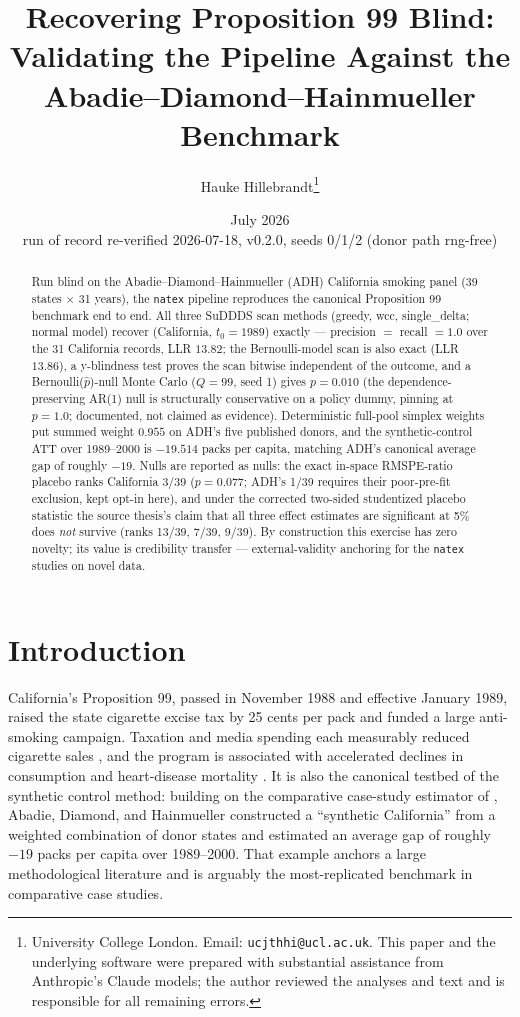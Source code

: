 \documentclass[11pt]{article}
\title{Recovering Proposition 99 Blind: Validating the \natex{} Pipeline
Against the Abadie--Diamond--Hainmueller Benchmark}
\author{Hauke Hillebrandt\thanks{University College London. Email:
\texttt{ucjthhi@ucl.ac.uk}. This paper and the underlying \natex{} software were
prepared with substantial assistance from Anthropic's Claude models; the author
reviewed the analyses and text and is responsible for all remaining errors.}}
\date{July 2026 \\ \small run of record re-verified 2026-07-18, \natex{}
v0.2.0, seeds 0/1/2 (donor path rng-free)}
\newcommand{\natex}{\texttt{natex}}
\begin{document}
\maketitle

\begin{abstract}
\noindent Run blind on the Abadie--Diamond--Hainmueller (ADH) California
smoking panel (39 states $\times$ 31 years), the \natex{} pipeline reproduces
the canonical Proposition 99 benchmark end to end. All three SuDDDS scan
methods (greedy, wcc, single\_delta; normal model) recover
(California, $t_0 = 1989$) exactly --- precision $=$ recall $= 1.0$ over the 31
California records, LLR $13.82$; the Bernoulli-model scan is also exact (LLR
$13.86$), a y-blindness test proves the scan bitwise independent of the
outcome, and a Bernoulli($\hat p$)-null Monte Carlo ($Q=99$, seed 1) gives
$p = 0.010$ (the dependence-preserving AR(1) null is structurally
conservative on a policy dummy, pinning at $p = 1.0$; documented, not
claimed as evidence). Deterministic full-pool simplex weights put summed
weight $0.955$ on ADH's five published donors, and the synthetic-control ATT
over 1989--2000 is $-19.514$ packs per capita, matching ADH's canonical
average gap of roughly $-19$. Nulls are reported as nulls: the
exact in-space RMSPE-ratio placebo ranks California 3/39 ($p = 0.077$;
ADH's 1/39 requires their poor-pre-fit exclusion, kept opt-in here),
and under the corrected two-sided studentized placebo statistic the source
thesis's claim that all three effect estimates are significant at 5\% does
\emph{not} survive (ranks 13/39, 7/39, 9/39). By construction this exercise
has zero novelty; its value is credibility transfer --- external-validity
anchoring for the \natex{} studies on novel data.
\end{abstract}

\section{Introduction}\label{sec:intro}

California's Proposition 99, passed in November 1988 and effective January
1989, raised the state cigarette excise tax by 25 cents per pack and funded a
large anti-smoking campaign. Taxation and media spending each measurably
reduced cigarette sales \cite{hu1995}, and the program is associated with
accelerated declines in consumption and heart-disease mortality
\cite{fichtenberg2000}. It is
also the canonical testbed of the synthetic control method: building on the
comparative case-study estimator of \cite{abadiegardeazabal2003}, Abadie,
Diamond, and Hainmueller \cite{abadie2010} constructed a ``synthetic
California'' from a weighted combination of donor states and estimated an
average gap of roughly $-19$ packs per capita over 1989--2000. That
example anchors a large methodological literature
\cite{abadie2015,abadie2021,benmichael2021} and is arguably the
most-replicated benchmark in comparative case studies.
\end{document}
